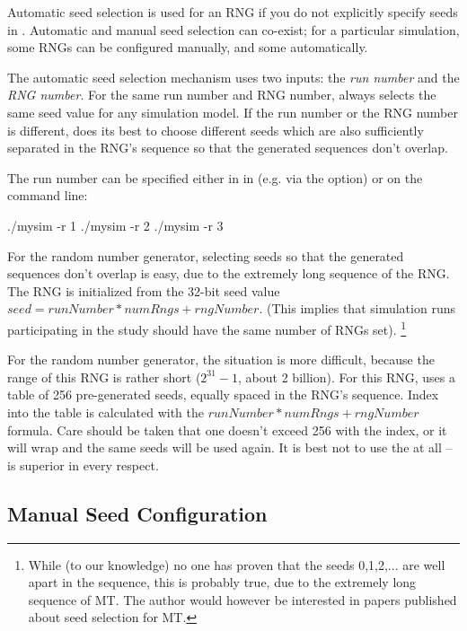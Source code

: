 Automatic seed selection is used for an RNG if you do not explicitly
specify seeds in . Automatic and manual seed selection can
co-exist; for a particular simulation, some RNGs can be configured
manually, and some automatically.

The automatic seed selection mechanism uses two inputs: the \textit{run number}
 and the \textit{RNG number}. For the same run number and RNG number,
{\opp} always selects the same seed value for any simulation model.
If the run number or the RNG number is different, {\opp} does its best
to choose different seeds which are also sufficiently separated in the RNG's sequence
so that the generated sequences don't overlap.

The run number can be specified either in in  (e.g. via the
 option) or on the command line:

\begin{commandline}
./mysim -r 1
./mysim -r 2
./mysim -r 3
\end{commandline}

For the  random number generator, selecting seeds
so that the generated sequences don't overlap is easy,
due to the extremely long sequence of the RNG.
The RNG is initialized from the 32-bit seed value $seed = runNumber*numRngs + rngNumber$.
(This implies that simulation runs participating in the study should have
the same number of RNGs set).
    \footnote{While (to our knowledge) no one has proven that the seeds 0,1,2,...
    are well apart in the sequence, this is probably true, due to the extremely
    long sequence of MT. The author would however be interested in papers
    published about seed selection for MT.}

For the  random number generator, the situation is more difficult,
because the range of this RNG is rather short ($2^{31}-1$, about 2 billion).
For this RNG, {\opp} uses a table of 256 pre-generated seeds, equally spaced
in the RNG's sequence. Index into the table is calculated with the
$runNumber*numRngs + rngNumber$ formula. Care should be taken that
one doesn't exceed 256 with the index, or it will wrap and the
same seeds will be used again. It is best not to use the 
at all --  is superior in every respect.


\subsection{Manual Seed Configuration}
\label{sec:config-sim:manual-seed-configuration}

